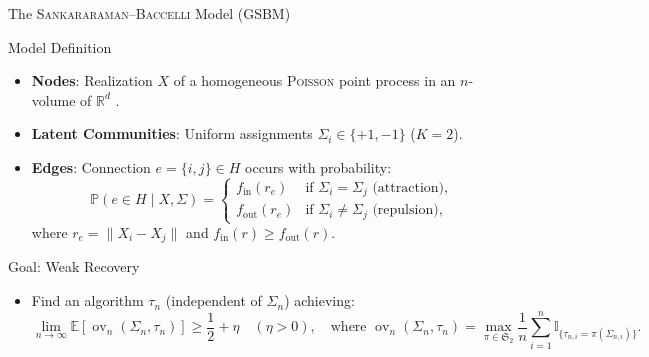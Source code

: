 \documentclass[A4,svgnames,9pt,aspectratio=169]{beamer}
\newcommand{\ov}{\operatorname{ov}}
\newcommand{\ind}[1]{\mathbb{I}_{\{#1\}}}
\begin{document}
\begin{frame}{The \textsc{Sankararaman}--\textsc{Baccelli} Model (GSBM)}
  \begin{block}{Model Definition \cite{SankararamanBaccelli2018}}
    \begin{itemize}
      \item \textbf{Nodes}: Realization $X$ of a homogeneous \textsc{Poisson} point process in an $n$-volume of $\mathbb{R}^d$ \cite{BB}.
      \item \textbf{Latent Communities}: Uniform assignments $\Sigma_i \in \{+1, -1\}$ ($K=2$).
      \item \textbf{Edges}: Connection $e=\{i,j\} \in H$ occurs with probability:
        \begin{equation*}
            \mathbb{P}(e \in H \mid X, \Sigma) =
            \begin{cases}
                f_{\mathrm{in}}(r_e) & \text{if } \Sigma_i = \Sigma_j \text{ (attraction),} \\
                f_{\mathrm{out}}(r_e) & \text{if } \Sigma_i \neq \Sigma_j \text{ (repulsion),}
            \end{cases}
        \end{equation*}
        where $r_e = \|X_i - X_j\|$ and $f_{\mathrm{in}}(r) \ge f_{\mathrm{out}}(r)$.
    \end{itemize}
  \end{block}
  \begin{block}{Goal: Weak Recovery}
    \begin{itemize}
      \item Find an algorithm $\tau_n$ (independent of $\Sigma_n$) achieving:
        \begin{equation*}
            \lim_{n\to\infty} \mathbb{E}[\ov_n(\Sigma_n, \tau_n)] \ge \frac{1}{2} + \eta \quad (\eta > 0), \quad \text{where } \ov_n(\Sigma_n, \tau_n) = \max_{\pi \in \mathfrak{S}_2} \frac{1}{n} \sum_{i=1}^n \ind{\tau_{n,i} = \pi(\Sigma_{n,i})}.
        \end{equation*}
    \end{itemize}
  \end{block}
\end{frame}
\end{document}
